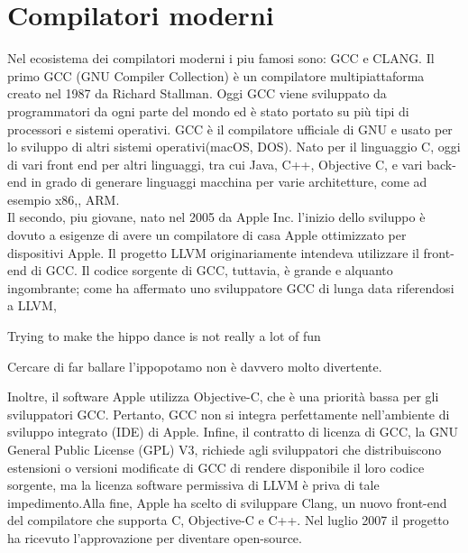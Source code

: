 \documentclass[12pt,a4paper]{report}
\begin{document}
\section{Compilatori moderni}
Nel ecosistema dei compilatori moderni i piu famosi sono: GCC e CLANG.
Il primo GCC (GNU Compiler Collection) è un compilatore multipiattaforma creato nel 1987 da Richard Stallman. Oggi GCC viene sviluppato da programmatori da ogni parte del mondo ed è stato portato su più tipi di processori e sistemi operativi. GCC è il compilatore ufficiale di GNU e usato per lo sviluppo di altri sistemi operativi(macOS, DOS).
Nato per il linguaggio C,  oggi di vari front end per altri linguaggi, tra cui Java, C++, Objective C, e vari back-end   in grado di generare linguaggi macchina per varie architetture, come ad esempio x86,, ARM.\\

Il secondo, piu giovane, nato nel 2005 da Apple Inc. l'inizio dello sviluppo è dovuto a esigenze di avere un compilatore di casa Apple ottimizzato per dispositivi Apple. 
Il progetto LLVM originariamente intendeva utilizzare il front-end di GCC. Il codice sorgente di GCC, tuttavia, è grande e alquanto ingombrante; come ha affermato uno sviluppatore GCC di lunga data riferendosi a LLVM, 

\begin{center}
Trying to make the hippo dance is not really a lot of fun\\
 \begin{footnotesize}
 	Cercare di far ballare l'ippopotamo non è davvero molto divertente.
 \end{footnotesize}
 	
\end{center}

Inoltre, il software Apple utilizza Objective-C, che è una priorità bassa per gli sviluppatori GCC. Pertanto, GCC non si integra perfettamente nell'ambiente di sviluppo integrato (IDE) di Apple. Infine, il contratto di licenza di GCC, la GNU General Public License (GPL) V3, richiede agli sviluppatori che distribuiscono estensioni o versioni modificate di GCC di rendere disponibile il loro codice sorgente, ma la licenza software permissiva di LLVM è priva di tale impedimento.Alla fine, Apple ha scelto di sviluppare Clang, un nuovo front-end del compilatore che supporta C, Objective-C e C++. Nel luglio 2007 il progetto ha ricevuto l'approvazione per diventare open-source.
\end{document}
